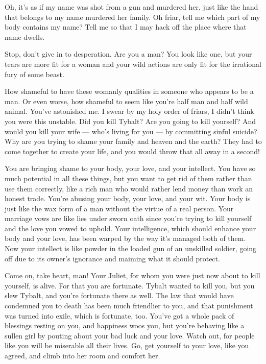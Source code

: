 \documentclass[12pt]{sides}
\newcommand{\brepl}[1]{\repl{\bf #1}}
\newcommand{\talkromeo}{\brepl{Romeo}}
\newcommand{\talklawrence}{\brepl{Lawrence}}
\begin{document}
\talkromeo
Oh, it's as if my name was shot from a gun and murdered her, just like the hand that belongs to my name murdered her family. Oh friar, tell me which part of my body contains my name? Tell me so that I may hack off the place where that name dwells.

\talklawrence
Stop, don't give in to desperation. Are you a man? You look like one, but your tears are more fit for a woman and your wild actions are only fit for the irrational fury of some beast.

How shameful to have these womanly qualities in someone who appears to be a man. Or even worse, how shameful to seem like you're half man and half wild animal. You've astonished me. I swear by my holy order of friars, I didn't think you were this unstable. Did you kill Tybalt? Are you going to kill yourself? And would you kill your wife — who's living for you — by committing sinful suicide? Why are you trying to shame your family and heaven and the earth? They had to come together to create your life, and you would throw that all away in a second!

You are bringing shame to your body, your love, and your intellect. You have so much potential in all these things, but you want to get rid of them rather than use them correctly, like a rich man who would rather lend money than work an honest trade. You're abusing your body, your love, and your wit. Your body is just like the wax form of a man without the virtue of a real person. Your marriage vows are like lies under sworn oath since you're trying to kill yourself and the love you vowed to uphold. Your intelligence, which should enhance your body and your love, has been warped by the way it's managed both of them. Now your intellect is like powder in the loaded gun of an unskilled soldier, going off due to its owner's ignorance and maiming what it should protect.

Come on, take heart, man! Your Juliet, for whom you were just now about to kill yourself, is alive. For that you are fortunate. Tybalt wanted to kill you, but you slew Tybalt, and you're fortunate there as well. The law that would have condemned you to death has been much friendlier to you, and that punishment was turned into exile, which is fortunate, too. You've got a whole pack of blessings resting on you, and happiness woos you, but you're behaving like a sullen girl by pouting about your bad luck and your love. Watch out, for people like you will be miserable all their lives. Go, get yourself to your love, like you agreed, and climb into her room and comfort her.
\end{document}

